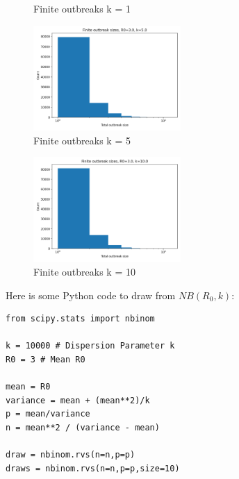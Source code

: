 \documentclass[11pt]{article}
\begin{document}
\begin{enumerate}
\begin{enumerate}[label=\alph*.]
\begin{figure}[H]
		\caption{Finite outbreaks k = 1}
		\label{fig:k_1}
	\end{figure}
	\begin{figure}[H]
		\centering
		\includegraphics[width=0.5\textwidth]{finite_sizes_R03_k5.0.png}
		\caption{Finite outbreaks k = 5}
		\label{fig:k_5}
	\end{figure}
	\begin{figure}[H]
		\centering
		\includegraphics[width=0.5\textwidth]{finite_sizes_R03_k10.0.png}
		\caption{Finite outbreaks k = 10}
		\label{fig:k_10}
	\end{figure}
\end{enumerate}

\clearpage
Here is some Python code to draw from $NB(R_0, k)$:
\begin{verbatim}
from scipy.stats import nbinom

k = 10000 # Dispersion Parameter k
R0 = 3 # Mean R0

mean = R0
variance = mean + (mean**2)/k
p = mean/variance
n = mean**2 / (variance - mean) 

draw = nbinom.rvs(n=n,p=p)
draws = nbinom.rvs(n=n,p=p,size=10)
\end{verbatim}



\end{enumerate}
\end{document}
